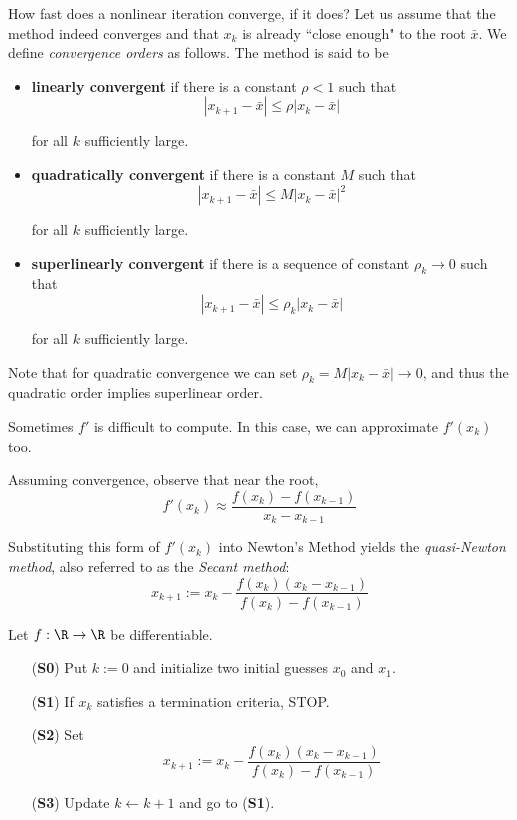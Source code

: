 How fast does a nonlinear iteration converge, if it does? Let us assume that
the method indeed converges and that $x_k$ is already ``close enough" to the
root $\bar x$. We define \textit{convergence orders} as follows. The method is
said to be
\begin{itemize}
  \item \textbf{linearly convergent} if there is a constant $\rho<1$ such that
        $$
          |x_{k+1}-\bar x|\leq\rho|x_k-\bar x|
        $$

        for all $k$ sufficiently large.
  \item \textbf{quadratically convergent} if there is a constant $M$ such that
        $$
          |x_{k+1}-\bar x|\leq M|x_k-\bar x|^2
        $$

        for all $k$ sufficiently large.
  \item \textbf{superlinearly convergent} if there is a sequence of constant
        $\rho_k\to0$ such that
        $$
          |x_{k+1}-\bar x|\leq\rho_k|x_k-\bar x|
        $$

        for all $k$ sufficiently large.
\end{itemize}

Note that for quadratic convergence we can set $\rho_k=M|x_k-\bar x|\to0$, and
thus the quadratic order implies superlinear order.

\label{b542f18}

Sometimes $f'$ is difficult to compute. In this case, we can approximate
$f'(x_k)$ too.

Assuming convergence, observe that near the root,
$$
  f'(x_k)\approx\frac{f(x_k)-f(x_{k-1})}{x_k-x_{k-1}}
$$

Substituting this form of $f'(x_k)$ into Newton's Method yields the
\textit{quasi-Newton method}, also referred to as the \textit{Secant method}:
$$
  x_{k+1}:=x_k-\frac{f(x_k)(x_k-x_{k-1})}{f(x_k)-f(x_{k-1})}
$$

\label{dc8c172}

Let $f:\R\to\R$ be differentiable.
\begin{itemize}
  \item[(\textbf{S0})] Put $k:=0$ and initialize two initial guesses $x_0$ and $x_1$.
  \item[(\textbf{S1})] If $x_k$ satisfies a termination criteria, STOP.
  \item[(\textbf{S2})] Set
        $$
          x_{k+1}:=x_k-\frac{f(x_k)(x_k-x_{k-1})}{f(x_k)-f(x_{k-1})}
        $$
  \item[(\textbf{S3})] Update $k\gets k+1$ and go to (\textbf{S1}).
\end{itemize}

